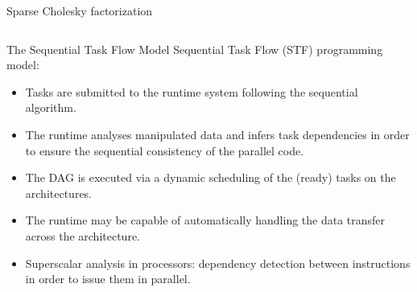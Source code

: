 \documentclass{beamer}
\newcommand{\db}[1]{\textcolor{mblue}{#1\xspace}}
\begin{document}
\begin{frame}{Sparse Cholesky factorization}
\begin{columns}
\begin{column}{0.4\textwidth}
    \end{column}

    \end{columns}

\end{frame}

\begin{frame}{The Sequential Task Flow Model}  
  \alert{Sequential Task Flow} (STF) programming model:

  \begin{itemize}
  \item Tasks are submitted to the runtime system following the
    \db{sequential algorithm}.
  \item The runtime analyses manipulated data and infers task
    dependencies in order to ensure the \db{sequential consistency} of
    the parallel code.
  \item The DAG is executed via a \db{dynamic scheduling} of the
    (ready) tasks on the architectures.
  \item The runtime may be capable of automatically handling the data
    transfer across the architecture.
  \item \db{Superscalar analysis} in processors: dependency detection
    between instructions in order to issue them in parallel.
  \end{itemize} 
\end{frame}
\end{document}
